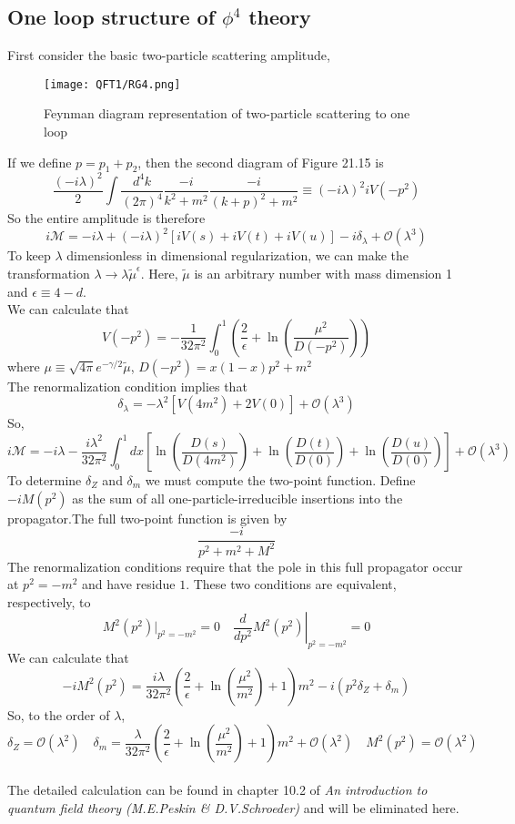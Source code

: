 \subsection{One loop structure of $\phi^4$ theory}
First consider the basic two-particle scattering amplitude,
\begin{figure}[!h]
\centering
\texttt{[image: QFT1/RG4.png]}
\caption{Feynman diagram representation of two-particle scattering to one loop}
\end{figure}
If we define $p = p_1 + p_2$, then the second diagram of Figure 21.15 is
\[\frac{(-i\lambda)^2}{2} \int \frac{d^4k}{(2\pi)^4} \frac{-i}{k^2+m^2} \frac{-i}{(k+p)^2+m^2} \equiv (-i\lambda)^2 iV(-p^2)\]
So the entire amplitude is therefore
\[i\mathcal{M} = -i\lambda + (-i\lambda)^2 [iV(s) + iV(t) + iV(u)] -i\delta_{\lambda} + \mathcal{O}(\lambda^3)\] 
To keep $\lambda$ dimensionless in dimensional regularization, we can make the transformation $\lambda \to \lambda \tilde{\mu}^{\epsilon}$. Here, $\tilde{\mu}$ is an arbitrary number with mass dimension 1 and $\epsilon \equiv 4-d$. 
\\
We can calculate that
\[V(-p^2) = -\frac{1}{32\pi^2} \int_0^1 (\frac{2}{\epsilon} + \ln(\frac{\mu^2}{D(-p^2)}))\]
where $\mu \equiv  \sqrt{4\pi} e^{-\gamma/2} \tilde{\mu}$, $D(-p^2) = x(1-x)p^2+m^2$
\\
The renormalization condition implies that
\[\delta_{\lambda} = -\lambda^2[V(4m^2)+2V(0)] + \mathcal{O}(\lambda^3)\]
So,
\[i\mathcal{M} = -i\lambda -\frac{i\lambda^2}{32\pi^2} \int_0^1 dx \left[\ln(\frac{D(s)}{D(4m^2)}) +\ln(\frac{D(t)}{D(0)})+\ln(\frac{D(u)}{D(0)})\right] + \mathcal{O}(\lambda^3)\]
To determine $\delta_Z$ and $\delta_m$ we must compute the two-point function. Define $-iM(p^2)$ as the sum of all one-particle-irreducible insertions into the propagator.The full two-point function is given by
\[\frac{-i}{p^2 + m^2 + M^2}\]
The renormalization conditions require that the pole in this full propagator occur at $p^2=-m^2$ and have residue $1$. These two conditions are equivalent, respectively, to
\[M^2(p^2)|_{p^2=-m^2} = 0 \quad \left. \frac{d}{dp^2} M^2(p^2)\right|_{p^2=-m^2} =0\]
We can calculate that
\[-iM^2(p^2) = \frac{i\lambda}{32\pi^2}(\frac{2}{\epsilon} + \ln(\frac{\mu^2}{m^2})+1)m^2 -i(p^2\delta_Z + \delta_m)\]
So, to the order of $\lambda$, 
\[\delta_Z=\mathcal{O}(\lambda^2) \quad \delta_m = \frac{\lambda}{32\pi^2}(\frac{2}{\epsilon} + \ln(\frac{\mu^2}{m^2})+1)m^2 + \mathcal{O}(\lambda^2) \quad M^2(p^2) =\mathcal{O}(\lambda^2)\]
\\
The detailed calculation can be found in chapter 10.2 of \emph{An introduction to quantum field theory (M.E.Peskin \& D.V.Schroeder)} and will be eliminated here.

